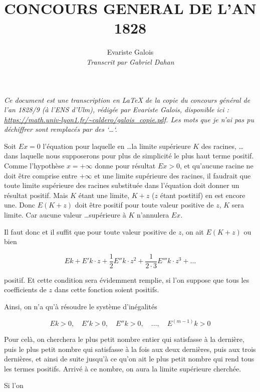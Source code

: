 \documentclass[11pt]{article}
\title{CONCOURS GENERAL DE L'AN 1828}
\author{Evariste Galois \\ \textit{Transcrit par Gabriel Dahan}}
\date{}
\begin{document}
    
\maketitle

\textit{Ce document est une transcription en \LaTeX{} de la copie du concours g\'en\'eral de l'an 1828/9 (à l'ENS d'Ulm), 
r\'edig\'ee par Evariste Galois, disponible ici : \url{https://math.univ-lyon1.fr/~caldero/galois_copie.pdf}.
Les mots que je n'ai pas pu d\'echiffrer sont remplac\'es par des `\dots`.}\newline
\newline
    
Soit $Ex=0$ l'équation pour laquelle en \dots la limite supérieure $K$ des racines, \dots dans
laquelle nous supposerons pour plus de simplicité le plus haut terme positif. Comme 
l'hypothèse $x=+\infty$ donne pour résultat $Ex>0$, et qu'aucune racine ne doit être 
comprise entre $+\infty$ et une limite supérieure des racines, il faudrait que toute limite 
supérieure des racines substituée dans l'équation doit donner un résultat positif. Mais 
$K$ étant une limite, $K+z$ ($z$ étant postitif) en est encore une. Donc $E(K+z)$ doit 
être positif pour toute valeur positive de $z$, $K$ sera limite. Car aucune valeur \dots supérieure à
$K$ n'annulera $Ex$.

Il faut donc et il suffit que pour toute valeur positive de $z$, on ait $E(K+z)$ ou bien 

$$Ek+E'k\cdot z+\frac{1}{2}E''k\cdot z^2+\frac{1}{2\cdot 3}E'''k\cdot z^3+\dots$$

positif. Et cette condition sera évidemment remplie, si l'on suppose que tous les coefficients 
de $z$ dans cette fonction soient positifs.

Ainsi, on n'a qu'à résoudre le système d'inégalités 

$$Ek>0, \quad E'k>0, \quad E''k>0, \quad \dots, \quad E^{(m-1)}k>0$$

Pour celà, on cherchera le plus petit nombre entier qui satisfasse à la dernière, puis
le plus petit nombre qui satisfasse à la fois aux deux dernières, puis aux trois 
dernières, et ainsi de suite jusqu'à ce qu'on ait le plus petit nombre qui rend tous
les termes positifs. Arrivé à ce nombre, on aura la limite supérieure cherchée.

Si l'on 
\end{document}
